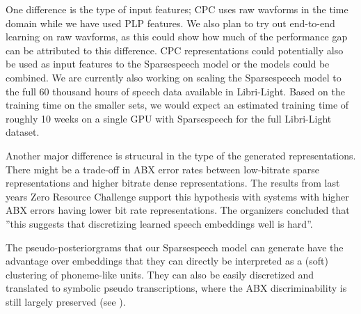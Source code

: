 \documentclass[a4paper]{article}
\begin{document}
One difference is the type of input features; CPC uses raw wavforms in the time domain while we have used PLP features. We also plan to try out end-to-end learning on raw wavforms, as this could show how much of the performance gap can be attributed to this difference. CPC representations could potentially also be used as input features to the Sparsespeech model or the models could be combined. We are currently also working on scaling the Sparsespeech model to the full 60 thousand hours of speech data available in Libri-Light. Based on the training time on the smaller sets, we would expect an estimated training time of roughly 10 weeks on a single GPU with Sparsespeech for the full Libri-Light dataset. 

Another major difference is strucural in the type of the generated representations. There might be a trade-off in ABX error rates between low-bitrate sparse representations and higher bitrate dense representations. The results from last years Zero Resource Challenge \cite{dunbar2019zero} support this hypothesis with systems with higher ABX errors having lower bit rate representations. The organizers concluded that ''this suggests that discretizing learned speech embeddings well is hard''. 

The pseudo-posteriorgrams that our Sparsespeech model can generate have the advantage over embeddings that they can directly be interpreted as a (soft) clustering of phoneme-like units. They can also be easily discretized and translated to symbolic pseudo transcriptions, where the ABX discriminability is still largely preserved (see \cite{milde2019sparsespeech}).








\end{document}
